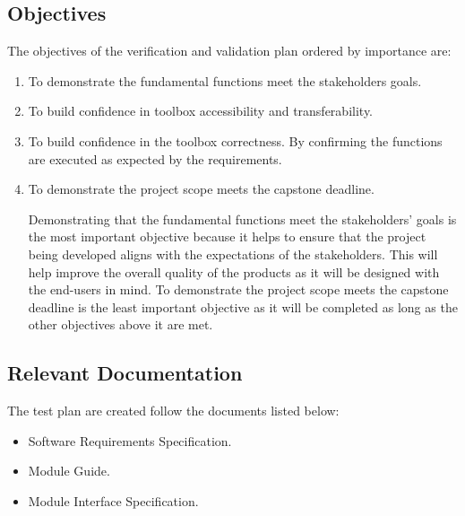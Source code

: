 \documentclass[12pt, titlepage]{article}
\begin{document}
\subsection{Objectives}
The objectives of the verification and validation plan ordered by importance are:
\begin{enumerate}
    \item To demonstrate the fundamental functions meet the stakeholders goals.
    \item To build confidence in toolbox accessibility and transferability. 
    \item To build confidence in the toolbox correctness. By confirming the functions are executed as expected by the requirements. 
    \item To demonstrate the project scope meets the capstone deadline. 


Demonstrating that the fundamental functions meet the stakeholders' goals is the most important objective because it helps to ensure that the project being developed aligns with the expectations of the stakeholders. This will help improve the overall quality of the products as it will be designed with the end-users in mind. To demonstrate the project scope meets the capstone deadline is the least important objective as it will be completed as long as the other objectives above it are met. 

\end{enumerate}


\subsection{Relevant Documentation}
The test plan are created follow the documents listed below:
\begin{itemize}
    \item Software Requirements Specification.
    \item Module Guide.
    \item Module Interface Specification.
\end{itemize}


\end{document}
